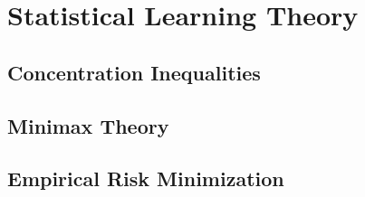 \documentclass{article}
\begin{document}
\section{Statistical Learning Theory} 

  \subsection{Concentration Inequalities}

  \subsection{Minimax Theory}

  \subsection{Empirical Risk Minimization} 
\end{document}
